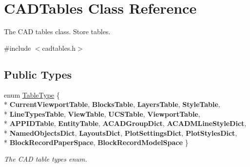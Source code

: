 \hypertarget{class_c_a_d_tables}{}\section{C\+A\+D\+Tables Class Reference}
\label{class_c_a_d_tables}


The C\+AD tables class. Store tables.  




{\ttfamily \#include $<$cadtables.\+h$>$}

\subsection*{Public Types}
\begin{DoxyCompactItemize}
\item 
enum \hyperlink{class_c_a_d_tables_a83b3acba13e77ca6961fcc4a2b85ddb5}{Table\+Type} \{ \\*
{\bfseries Current\+Viewport\+Table}, 
{\bfseries Blocks\+Table}, 
{\bfseries Layers\+Table}, 
{\bfseries Style\+Table}, 
\\*
{\bfseries Line\+Types\+Table}, 
{\bfseries View\+Table}, 
{\bfseries U\+C\+S\+Table}, 
{\bfseries Viewport\+Table}, 
\\*
{\bfseries A\+P\+P\+I\+D\+Table}, 
{\bfseries Entity\+Table}, 
{\bfseries A\+C\+A\+D\+Group\+Dict}, 
{\bfseries A\+C\+A\+D\+M\+Line\+Style\+Dict}, 
\\*
{\bfseries Named\+Objects\+Dict}, 
{\bfseries Layouts\+Dict}, 
{\bfseries Plot\+Settings\+Dict}, 
{\bfseries Plot\+Styles\+Dict}, 
\\*
{\bfseries Block\+Record\+Paper\+Space}, 
{\bfseries Block\+Record\+Model\+Space}
 \}\hypertarget{class_c_a_d_tables_a83b3acba13e77ca6961fcc4a2b85ddb5}{}\label{class_c_a_d_tables_a83b3acba13e77ca6961fcc4a2b85ddb5}
\begin{DoxyCompactList}\small\item\em The C\+AD table types enum. \end{DoxyCompactList}
\end{DoxyCompactItemize}
